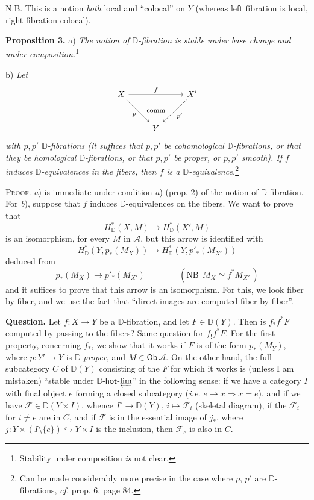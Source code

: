 \documentclass[11pt]{article}
\newcommand{\printedpage}[1]{\marginpar{\footnotesize p.~#1}}
\newcommand{\msp}[1]{\marginpar{\footnotesize [#1]}}
\newcommand{\DD}{\mathbb{D}}
\newcommand{\Ob}{\mathsf{Ob}}
\begin{document}
N.B. This is a notion \textit{both} local and ``colocal'' on $Y$ (whereas left fibration is local, right fibration colocal).

\printedpage{50}

\textbf{Proposition 3.} a) \textit{The notion of $\DD$-fibration is stable under base change and under composition.}\footnote[38]{Stability under composition \textit{is} not clear.}

\indent b) \textit{Let}
\[
\begin{tikzcd}[column sep=normal, row sep=large]
X \arrow[rr, "f"] \arrow[dr, "p"'] & \phantom{X} & X' \arrow[dl, "p'"] \\
& Y &
\arrow[from=1-2, to=2-2, phantom, "\text{\footnotesize comm}"]
\end{tikzcd}
\]
\textit{with $p,p'$ $\DD$-fibrations (it suffices that $p,p'$ be cohomological $\DD$-fibrations, or that they be homological $\DD$-fibrations, or that $p,p'$ be proper, or $p,p'$ smooth). If $f$ induces $\DD$-equivalences in the fibers, then $f$ is a $\DD$-equivalence.}\footnote[39]{Can be made considerably more precise in the case where $p$, $p'$ are $\DD$-fibrations, \textit{cf.} prop. 6, page 84.}

\indent\textsc{Proof.} \textit{a}) is immediate under condition \textit{a}) (prop. 2) of the notion of $\DD$-fibration. For \textit{b}), suppose that $f$ induces $\DD$-equivalences on the fibers. We want to prove that %
\[
H^*_{\DD}(X,M) \longrightarrow H^*_{\DD}(X',M)
\]
is an isomorphism, for every $M$ in $\mathcal{A}$, but this arrow is identified with
\[
H^*_{\DD}(Y, p_*(M_X)) \longrightarrow H^*_{\DD}(Y, p'_*(M_{X'}))
\]
deduced from
\[
p_*(M_X) \longrightarrow p'_*(M_{X'}) \qquad\qquad (\text{NB}\ \ M_X \simeq f^*M_{X'}\,)
\]
\msp{page 82}
and it suffices to prove that this arrow is an isomorphism. For this, we look fiber by fiber, and we use the fact that ``direct images are computed fiber by fiber''.

\textbf{Question.} Let $f : X \to Y$ be a $\DD$-fibration, and let $F \in \DD(Y)$. Then is $f_*f^*F$ computed by passing to the fibers? Same question for $f_!f^*F$. For the first property, concerning $f_*$, we show that it works if $F$ is of the form $p_*(M_Y)$, where $p : Y' \to Y$ is $\DD$-\textit{proper,} and $M \in \Ob\, \mathcal{A}$. On the other hand, the full subcategory $C$ of $\DD(Y)$ consisting of the $F$ for which it works is (unless I am mistaken) ``stable under $\DD$-$\mathsf{hot}$-$\varprojlim$'' in the following sense: if we have a category $I$ with final object $e$ forming a closed subcategory (\textit{i.e.} $e \to x \Rightarrow x = e$), and if we have $\mathcal{F} \in \DD(Y \times I)$, whence $I^\circ \to \DD(Y)$, $i \mapsto \mathcal{F}_i$ (skeletal diagram), if the $\mathcal{F}_i$ for $i \neq e$ are in $C$, and if $\mathcal{F}$ is in the essential image of $j_*$, where $j : Y \times (I \setminus \{e\}) \hookrightarrow Y \times I$ is the inclusion, then $\mathcal{F}_e$ is also in $C$.
\end{document}
